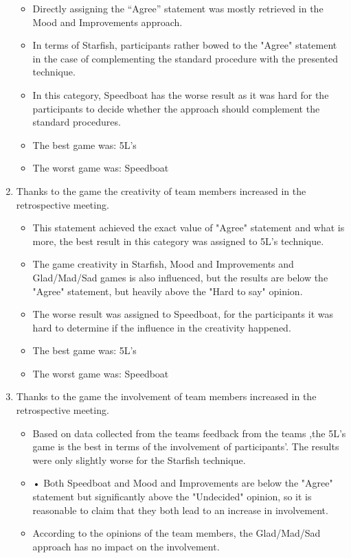 \begin{enumerate}
\begin{itemize}
        \item Directly assigning the “Agree” statement was mostly retrieved in the Mood and Improvements approach.
        \item In terms of Starfish, participants rather bowed to the "Agree" statement in the case of complementing the standard procedure with the presented technique.
        \item In this category, Speedboat has the worse result as it was hard for the participants to decide whether the approach should complement the standard procedures.
        \item The best game was: 5L's
        \item The worst game was: Speedboat
    \end{itemize}
    \item Thanks to the game the creativity of team members increased in the retrospective meeting.
    \begin{itemize}
        \item This statement achieved the exact value of "Agree" statement and what is more, the best result in this category was assigned to 5L's technique.
        \item The game creativity in Starfish, Mood and Improvements and Glad/Mad/Sad games is also influenced, but the results are below the "Agree" statement, but heavily above the "Hard to say" opinion.
        \item The worse result was assigned to Speedboat, for the participants it was hard to determine if the influence in the creativity happened. 
        \item The best game was: 5L's
        \item The worst game was: Speedboat
    \end{itemize}
    \item Thanks to the game the involvement of team members increased in the retrospective meeting.
    \begin{itemize}
        \item Based on data collected from the teams feedback from the teams ,the 5L’s game is the best in terms of the involvement of participants'. The results were only slightly worse for the Starfish technique. 
        \item•	Both Speedboat and Mood and Improvements are below the "Agree" statement but significantly above the "Undecided" opinion, so it is reasonable to claim that they both lead to an increase in involvement.
        \item According to the opinions of the team members, the Glad/Mad/Sad approach has no impact on the involvement.

\end{itemize}
\end{enumerate}
